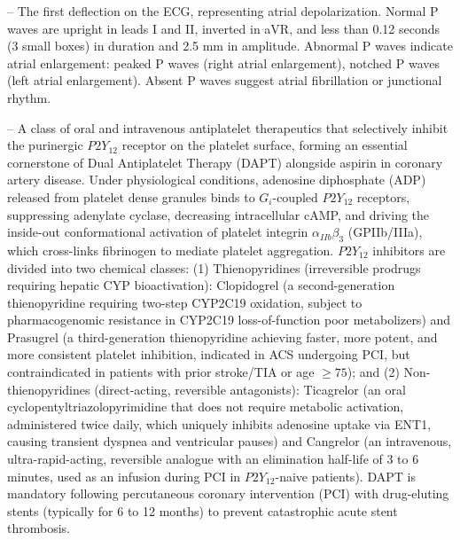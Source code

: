 -- The first deflection on the ECG, representing atrial depolarization. Normal P waves are upright in leads I and II, inverted in aVR, and less than 0.12 seconds (3 small boxes) in duration and 2.5 mm in amplitude. Abnormal P waves indicate atrial enlargement: peaked P waves (right atrial enlargement), notched P waves (left atrial enlargement). Absent P waves suggest atrial fibrillation or junctional rhythm.

-- A class of oral and intravenous antiplatelet therapeutics that selectively inhibit the purinergic $P2Y_{12}$ receptor on the platelet surface, forming an essential cornerstone of Dual Antiplatelet Therapy (DAPT) alongside aspirin in coronary artery disease. Under physiological conditions, adenosine diphosphate (ADP) released from platelet dense granules binds to $G_i$-coupled $P2Y_{12}$ receptors, suppressing adenylate cyclase, decreasing intracellular cAMP, and driving the inside-out conformational activation of platelet integrin $\alpha_{IIb}\beta_3$ (GPIIb/IIIa), which cross-links fibrinogen to mediate platelet aggregation. $P2Y_{12}$ inhibitors are divided into two chemical classes: (1) Thienopyridines (irreversible prodrugs requiring hepatic CYP bioactivation): Clopidogrel (a second-generation thienopyridine requiring two-step CYP2C19 oxidation, subject to pharmacogenomic resistance in CYP2C19 loss-of-function poor metabolizers) and Prasugrel (a third-generation thienopyridine achieving faster, more potent, and more consistent platelet inhibition, indicated in ACS undergoing PCI, but contraindicated in patients with prior stroke/TIA or age $\ge 75$); and (2) Non-thienopyridines (direct-acting, reversible antagonists): Ticagrelor (an oral cyclopentyltriazolopyrimidine that does not require metabolic activation, administered twice daily, which uniquely inhibits adenosine uptake via ENT1, causing transient dyspnea and ventricular pauses) and Cangrelor (an intravenous, ultra-rapid-acting, reversible analogue with an elimination half-life of 3 to 6 minutes, used as an infusion during PCI in $P2Y_{12}$-naive patients). DAPT is mandatory following percutaneous coronary intervention (PCI) with drug-eluting stents (typically for 6 to 12 months) to prevent catastrophic acute stent thrombosis.

